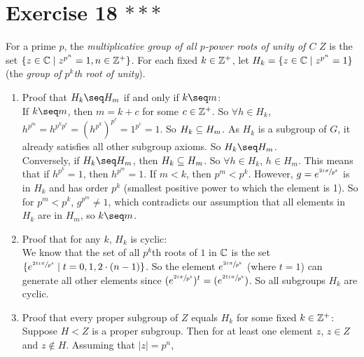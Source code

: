 \documentclass[12pt]{article}
\begin{document}
    \section*{Exercise 18 $***$}
    For a prime $p$,
    the \textit{multiplicative group of all $p$-power roots of unity of $C$}
    $Z$ is the set $\{z \in \mathbb{C} \mid z^{p^n} = 1, n \in \mathbb{Z}^+\}$.
    For each fixed $k \in \mathbb{Z}^+$, let $H_k = \{z \in \mathbb{C} \mid z^{p^n} = 1\}$
    (the \textit{group of $p^k$th root of unity}).
    \begin{enumerate}[label=\textbf{\alph*.}]
        \item
            Proof that $H_k \seq H_m$ if and only if $k \seq m$: \\
            If $k \seq m$, then $m = k + c$ for some $c \in \mathbb{Z}^+$.
            So $\forall h \in H_k$,
            $h^{p^m} = h^{p^kp^c} = (h^{p^k})^{p^c} = 1^{p^c} = 1$.
            So $H_k \subseteq H_m$.
            As $H_k$ is a subgroup of $G$, it already satisfies all other 
            subgroup axioms.
            So $H_k \seq H_m$. \\
            Conversely, if $H_k \seq H_m$,
            then $H_k \subseteq H_m$.
            So $\forall h \in H_k$, $h \in H_m$.
            This means that if $h^{p^k} = 1$, then $h^{p^m} = 1$.
            If $m < k$, then $p^m < p^k$.
            However, $g = e^{\sfrac{2i\pi}{p^k}}$ is in $H_k$
            and has order $p^k$
            (smallest positive power to which the element is 1).
            So for $p^m < p^k$, $g^{p^m} \neq 1$,
            which contradicts our assumption that all elements in $H_k$
            are in $H_m$,
            so $k \seq m$. 
        \item
            Proof that for any $k$, $H_k$ is cyclic: \\
            We know that the set of all $p^k$th roots of $1$ in $\mathbb{C}$
            is the set
            $\{ e^{\sfrac{2ti\pi}{p^k}} \mid t = 0, 1, 2 \cdot (n-1) \}$.
            So the element $e^{\sfrac{2i\pi}{p^k}}$ (where $t = 1$)
            can generate all other elements
            since $(e^{\sfrac{2i\pi}{p^k}})^t = (e^{\sfrac{2ti\pi}{p^k}})$.
            So all subgroups $H_k$ are cyclic.
        \item
            Proof that every proper subgroup of $Z$ equals $H_k$
            for some fixed $k \in \mathbb{Z}^+$: \\
            Suppose $H < Z$ is a proper subgroup.
            Then for at least one element $z$, $z \in Z$ and $z \notin H$.
            Assuming that $|z| = p^n$,

\end{enumerate}
\end{document}
